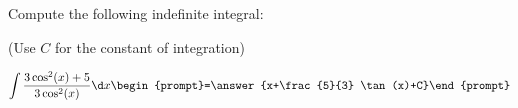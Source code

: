 \documentclass{ximera}
\author{Jim Talamo}
\begin{document}
\begin{exercise}
Compute the following indefinite integral:

\begin{prompt} (Use $C$ for the constant of integration) \end{prompt}

\[
\int \frac{3\cos^2(x)+5}{3\cos^2(x)} \d x 
\begin{prompt}=\answer{x+\frac{5}{3} \tan(x)+C}\end{prompt}
\]
\end{exercise}
\end{document}
